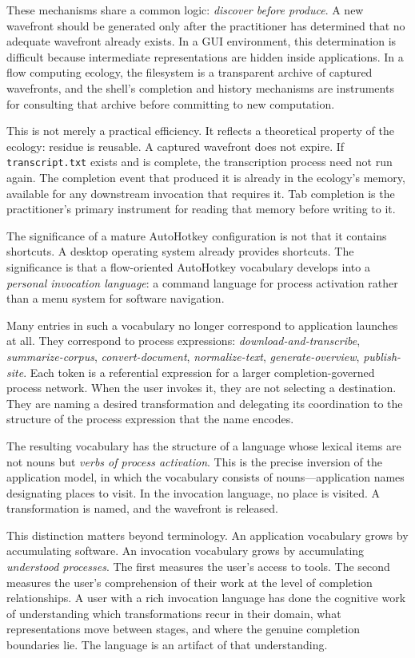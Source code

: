 \documentclass[12pt, a4paper]{article}
\begin{document}
These mechanisms share a common logic: \emph{discover before
produce}. A new wavefront should be generated only after the
practitioner has determined that no adequate wavefront already
exists. In a GUI environment, this determination is difficult
because intermediate representations are hidden inside
applications. In a flow computing ecology, the filesystem is
a transparent archive of captured wavefronts, and the shell's
completion and history mechanisms are instruments for consulting
that archive before committing to new computation.

This is not merely a practical efficiency. It reflects a
theoretical property of the ecology: residue is reusable.
A captured wavefront does not expire. If \texttt{transcript.txt}
exists and is complete, the transcription process need not run
again. The completion event that produced it is already in the
ecology's memory, available for any downstream invocation that
requires it. Tab completion is the practitioner's primary
instrument for reading that memory before writing to it.

The significance of a mature AutoHotkey configuration is not that
it contains shortcuts. A desktop operating system already provides
shortcuts. The significance is that a flow-oriented AutoHotkey
vocabulary develops into a \emph{personal invocation language}:
a command language for process activation rather than a menu system
for software navigation.

Many entries in such a vocabulary no longer correspond to application
launches at all. They correspond to process expressions:
\textit{download-and-transcribe}, \textit{summarize-corpus},
\textit{convert-document}, \textit{normalize-text},
\textit{generate-overview}, \textit{publish-site}. Each token
is a referential expression for a larger completion-governed process
network. When the user invokes it, they are not selecting a
destination. They are naming a desired transformation and delegating
its coordination to the structure of the process expression that the
name encodes.

The resulting vocabulary has the structure of a language whose
lexical items are not nouns but \emph{verbs of process activation}.
This is the precise inversion of the application model, in which
the vocabulary consists of nouns---application names designating
places to visit. In the invocation language, no place is visited.
A transformation is named, and the wavefront is released.

This distinction matters beyond terminology. An application
vocabulary grows by accumulating software. An invocation vocabulary
grows by accumulating \emph{understood processes}. The first
measures the user's access to tools. The second measures the user's
comprehension of their work at the level of completion relationships.
A user with a rich invocation language has done the cognitive work
of understanding which transformations recur in their domain,
what representations move between stages, and where the genuine
completion boundaries lie. The language is an artifact of that
understanding.
\end{document}

